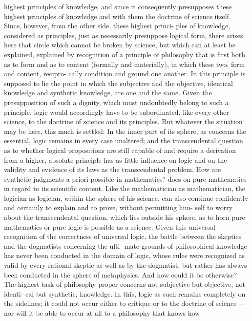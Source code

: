 highest principles of knowledge, and since it consequently presupposes
these highest principles of knowledge and with them the doctrine of
science itself. Since, however, from the other side, these highest princi-
ples of knowledge, considered as principles, just as necessarily presuppose
logical form, there arises here that circle which cannot be broken by
science, but which can at least be explained, explained by recognition of a
principle of philosophy that is first both as to form and as to content
(formally and materially), in which these two, form and content, recipro-
cally condition and ground one another. In this principle is supposed to lie
the point in which the subjective and the objective, identical knowledge
and synthetic knowledge, are one and the same.
Given the presupposition of such a dignity, which must undoubtedly
belong to such a principle, logic would accordingly have to be subordinated,
like every other science, to the doctrine of science and its principles.
But whatever the situation may be here, this much is settled: In the
inner part of its sphere, as concerns the essential, logic remains in every
case unaltered; and the transcendental question as to whether logical
propositions are still capable of and require a derivation from a higher,
absolute principle has as little influence on logic and on the validity and
evidence of its laws as the transcendental problem, How are synthetic
judgments a priori possible in mathematics? does on pure mathematics in
regard to its scientific content. Like the mathematician as mathematician,
the logician as logician, within the sphere of his science, can also continue
confidently and certainly to explain and to prove, without permitting him-
self to worry about the transcendental question, which lies outside his
sphere, as to horn pure mathematics or pure logic is possible as a science.
Given this universal recognition of the correctness of universal logic,
the battle between the skeptics and the dogmatists concerning the ulti-
mate grounds of philosophical knowledge has never been conducted in
the domain of logic, whose rules were recognized as valid by every rational
skeptic as well as by the dogmatist, but rather has always been conducted
in the sphere of metaphysics. And how could it be otherwise? The highest
task of philosophy proper concerns not subjective but objective, not identi-
cal but synthetic, knowledge. In this, logic as such remains completely on
the sidelines; it could not occur either to critique or to the doctrine of
science — nor will it be able to occur at all to a philosophy that knows how

